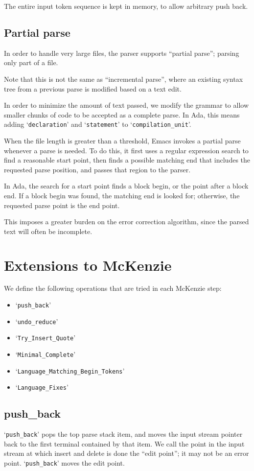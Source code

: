 \documentclass{article}
\newcommand{\code}[1]{`{\tt #1}'}
\begin{document}
The entire input token sequence is kept in memory, to allow arbitrary
push back.

\subsection{Partial parse}
In order to handle very large files, the parser supports ``partial
parse''; parsing only part of a file.

Note that this is not the same as ``incremental parse'', where an
existing syntax tree from a previous parse is modified based on a text
edit.

In order to minimize the amount of text passed, we modify the grammar
to allow smaller chunks of code to be accepted as a complete parse. In
Ada, this means adding \code{declaration} and \code{statement} to
\code{compilation\_unit}.

When the file length is greater than a threshold, Emacs invokes a
partial parse whenever a parse is needed. To do this, it first uses a
regular expression search to find a reasonable start point, then finds
a possible matching end that includes the requested parse position, and
passes that region to the parser.

In Ada, the search for a start point finds a block begin, or the point
after a block end. If a block begin was found, the matching end is
looked for; otherwise, the requested parse point is the end point.

This imposes a greater burden on the error correction algorithm, since
the parsed text will often be incomplete.

\section{Extensions to McKenzie}
We define the following operations that are tried in each McKenzie
step:
\begin{itemize}
\item \code{push\_back}
\item \code{undo\_reduce}
\item \code{Try\_Insert\_Quote}
\item \code{Minimal\_Complete}
\item \code{Language\_Matching\_Begin\_Tokens}
\item \code{Language\_Fixes}
\end{itemize}

\subsection{push\_back}
\code{push\_back} pops the top parse stack item, and moves the input
stream pointer back to the first terminal contained by that item. We
call the point in the input stream at which insert and delete is done
the ``edit point''; it may not be an error point. \code{push\_back}
moves the edit point.
\end{document}
